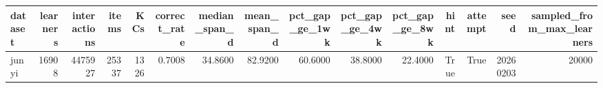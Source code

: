 \begin{tabular}{lrrrrrrrrrrrrrr}
\toprule
dataset & learners & interactions & items & KCs & correct\_rate & median\_span\_d & mean\_span\_d & pct\_gap\_ge\_1wk & pct\_gap\_ge\_4wk & pct\_gap\_ge\_8wk & hint & attempt & seed & sampled\_from\_max\_learners \\
\midrule
junyi & 16908 & 4475927 & 25337 & 1326 & 0.7008 & 34.8600 & 82.9200 & 60.6000 & 38.8000 & 22.4000 & True & True & 20260203 & 20000 \\
\bottomrule
\end{tabular}
